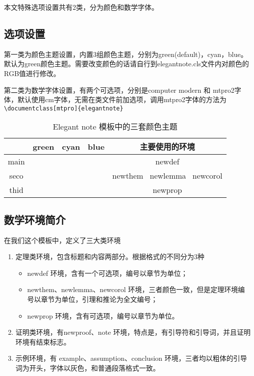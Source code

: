 \documentclass[cyan]{elegantnote}
\begin{document}
本文特殊选项设置共有2类，分为{\color{main}颜色}和{\color{main}数学字体}。

\subsection{选项设置}
第一类为{\color{main}颜色}主题设置，内置3组颜色主题，分别为green(default)，cyan，blue。默认为green颜色主题。需要改变颜色的话请自行到elegantnote.cls文件内对颜色的RGB值进行修改。

第二类为{\color{main}数学字体}设置，有两个可选项，分别是computer modern 和 mtpro2字体，默认使用cm字体，无需在类文件前加选项，调用mtpro2字体的方法为\verb|\documentclass[mtpro]{elegantnote}|

\begin{table}[htp]
\centering
\begin{tabular}{ccccc}
\toprule	
	   & green & cyan & blue & 主要使用的环境\\ 
\midrule
main & \makecell{{\color{main1}\rule{1cm}{1cm}}}& \makecell{{\color{main2}\rule{1cm}{1cm}}}&\makecell{ {\color{main3}\rule{1cm}{1cm}}}& newdef\\

seco &\makecell{ {\color{seco1}\rule{1cm}{1cm}}}& \makecell{{\color{seco2}\rule{1cm}{1cm}}}&\makecell{ {\color{seco3}\rule{1cm}{1cm}}}&newthem \ newlemma \ newcorol\\

thid &\makecell{ {\color{thid1}\rule{1cm}{1cm}}}& \makecell{{\color{thid2}\rule{1cm}{1cm}}}&\makecell{ {\color{thid3}\rule{1cm}{1cm}}}&newprop\\
\bottomrule
\end{tabular}
\caption{Elegant note 模板中的三套颜色主题\label{tab:color thm}}
\end{table}

\subsection{数学环境简介}
在我们这个模板中，定义了三大类环境
\begin{enumerate}
\item 定理类环境，包含标题和内容两部分。根据格式的不同分为3种
\begin{itemize}
\item {\color{main} newdef} 环境，含有一个可选项，编号以章节为单位；
\item {\color{main}newthem、newlemma、newcorol} 环境，三者颜色一致，但是定理环境编号以章节为单位，引理和推论为全文编号；
\item newprop 环境，含有可选项，编号以章节为单位。
\end{itemize}
\item 证明类环境，有{\color{main}newproof、note} 环境，特点是，有引导符和引导词，并且证明环境有结束标志。
\item 示例环境，有{\color{main} example、assumption、conclusion} 环境，三者均以粗体的引导词为开头，字体以灰色，和普通段落格式一致。
\end{enumerate}
\end{document}
